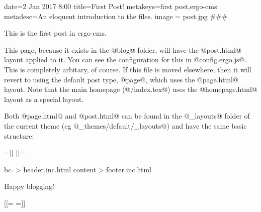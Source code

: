 date=2 Jan 2017 8:00
title=First Post!
metakeys=first post,ergo-cms
metadesc=An eloquent introduction to the files.
image = post.jpg
###

This is the first post in ergo-cms. 

This page, because it exists in the @blog@ folder, will have the @post.html@ layout applied to it. You can see the configuration for this in @config.ergo.js@. This is completely arbitary, of course. If this file is moved elsewhere, then it will revert to using the default post type, @page@, which uses the @page.html@ layout. Note that the main homepage (@/index.tex@) uses the @homepage.html@ layout as a special layout.

Both @page.html@ and @post.html@ can be found in the @_layouts@ folder of the current theme (eg @_themes/default/_layouts@) and have the same basic structure:

{{=[[ ]]=}}

bc. {{> header.inc.html}}
{{{content}}}
{{> footer.inc.html}}

Happy blogging!

[[={{ }}=]]

